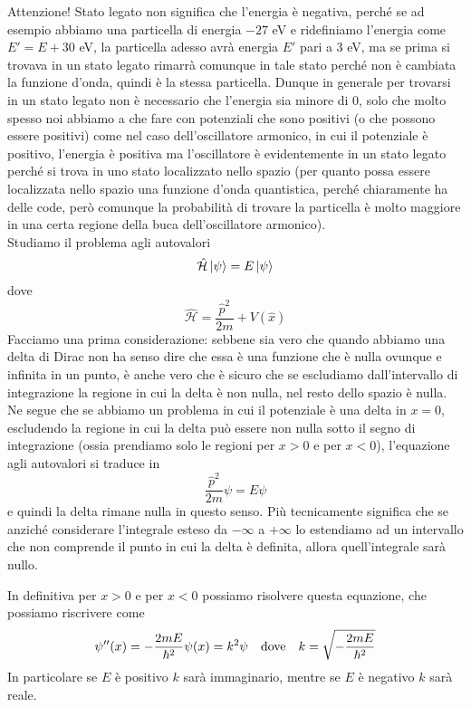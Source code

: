 \begin{soluzione}
   Attenzione! Stato legato non significa che l'energia è negativa, perché se ad esempio abbiamo una particella di energia $-27$ eV e ridefiniamo l'energia come $E'=E + 30$ eV, la particella adesso avrà energia $E'$ pari a 3 eV, ma se prima si trovava in un stato legato rimarrà comunque in tale stato perché non è cambiata la funzione d'onda, quindi è la stessa particella. Dunque in generale per trovarsi in un stato legato non è necessario che l'energia sia minore di 0, solo che molto spesso noi abbiamo a che fare con potenziali che sono positivi (o che possono essere positivi) come nel caso dell'oscillatore armonico, in cui il potenziale è positivo, l'energia è positiva ma l'oscillatore è evidentemente in un stato legato perché si trova in uno stato localizzato nello spazio (per quanto possa essere localizzata nello spazio una funzione d'onda quantistica, perché chiaramente ha delle code, però comunque la probabilità di trovare la particella è molto maggiore in una certa regione della buca dell'oscillatore armonico).\\
   Studiamo il problema agli autovalori
   \begin{equation*}
      \hat{\mathcal{H}}\ket*{\psi}=E\ket*{\psi}
   \end{equation*}
   dove
   \begin{equation*}
      \hat{\mathcal{H}}=\frac{\hat{p}^2}{2m} + V(\hat{x})
   \end{equation*}
   Facciamo una prima considerazione: sebbene sia vero che quando abbiamo una delta di Dirac non ha senso dire che essa è una funzione che è nulla ovunque e infinita in un punto, è anche vero che è sicuro che se escludiamo dall'intervallo di integrazione la regione in cui la delta è non nulla, nel resto dello spazio è nulla. Ne segue che se abbiamo un problema in cui il potenziale è una delta in $x=0$, escludendo la regione in cui la delta può essere non nulla sotto il segno di integrazione (ossia prendiamo solo le regioni per $x>0$ e per $x<0$), l'equazione agli autovalori si traduce in
   \begin{equation*}
      \frac{\hat{p}^2}{2m}\psi=E\psi
   \end{equation*}
   e quindi la delta rimane nulla in questo senso. Più tecnicamente significa che se anziché considerare l'integrale esteso da $-\infty$ a $+\infty$ lo estendiamo ad un intervallo che non comprende il punto in cui la delta è definita, allora quell'integrale sarà nullo.
   
   In definitiva per $x>0$ e per $x<0$ possiamo risolvere questa equazione, che possiamo riscrivere come
   \begin{equation*}
      \psi''(x)=-\frac{2mE}{\hbar^2}\psi(x)=k^2\psi
      \qqtext{dove}
      k=\sqrt{-\frac{2mE}{\hbar^2}}
   \end{equation*}
   In particolare se $E$ è positivo $k$ sarà immaginario, mentre se $E$ è negativo $k$ sarà reale.
   

\end{soluzione}
